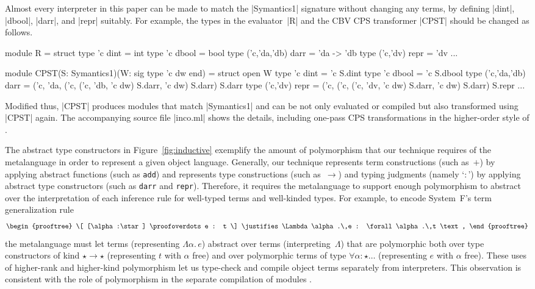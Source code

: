 Almost every interpreter in this paper can be made to match the
|Symantics1| signature without changing any terms, by defining
|dint|, |dbool|, |darr|, and |repr| suitably.  For example,
the types in the evaluator~|R| and the CBV CPS transformer |CPST|
should be changed as follows.
\begin{code}[commandchars=\@\[\]]
module R = struct
  type 'c dint = int
  type 'c dbool = bool
  type ('c,'da,'db) darr = 'da -> 'db
  type ('c,'dv) repr = 'dv   ...

module CPST(S: Symantics1)(W: sig type 'c dw end) = struct open W
  type 'c dint = 'c S.dint
  type 'c dbool = 'c S.dbool
  type ('c,'da,'db) darr =
    ('c, 'da, ('c, ('c, 'db, 'c dw) S.darr, 'c dw) S.darr) S.darr
  type ('c,'dv) repr =
    ('c, ('c, ('c, 'dv, 'c dw) S.darr, 'c dw) S.darr) S.repr   ...
\end{code}
Modified thus, |CPST| produces modules that match |Symantics1| and
can be not only evaluated or compiled but also transformed
using |CPST| again.  The accompanying source file |inco.ml| shows
the details, including one-pass CPS transformations in the
higher-order style of \citet{danvy-representing}.

The abstract type constructors in Figure~\ref{fig:inductive} exemplify
the amount of polymorphism that our technique requires of the
metalanguage in order to represent a given object language.  Generally,
our technique represents term constructions (such as~$+$) by applying
abstract functions (such as \texttt{add}) and represents type
constructions (such as~$\to$) and typing judgments (namely `$:$') by
applying abstract type constructors (such as \texttt{darr} and
\texttt{repr}).  Therefore, it requires the metalanguage to support
enough polymorphism to abstract over the interpretation of each
inference rule for well-typed terms and well-kinded types.  For example,
to encode System~F's term generalization rule
\begin{equation*}
    \begin{prooftree}
        \[ [\alpha:\star] \proofoverdots e : t \]
        \justifies \Lambda\alpha.\,e : \forall\alpha.\,t \text,
    \end{prooftree}
\end{equation*}
the metalanguage must let terms (representing $\Lambda\alpha.\,e$)
abstract over terms (interpreting~$\Lambda$) that are polymorphic both
over type constructors of kind $\star\to\star$ (representing $t$ with
$\alpha$ free) and over polymorphic terms of type
$\forall\alpha\colon\star\dotso$ (representing $e$ with $\alpha$ free).
These uses of
higher-rank and higher-kind
polymorphism let us type-check and compile object terms separately from
interpreters.  This observation is consistent with the role of
polymorphism in the separate compilation of modules
\citep{shao-typed}.

